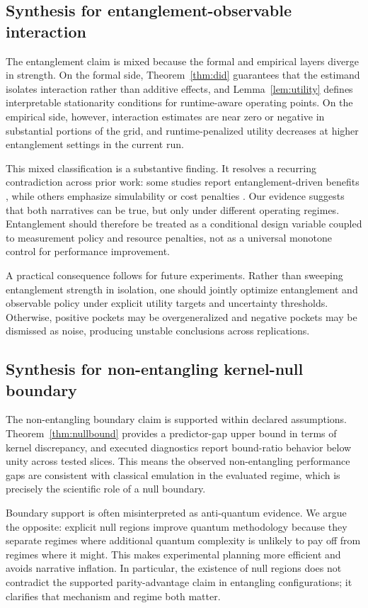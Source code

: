 \documentclass{article} %
\begin{document}
\subsection{Synthesis for entanglement-observable interaction}
The entanglement claim is mixed because the formal and empirical layers diverge in strength. On the formal side, Theorem~\ref{thm:did} guarantees that the estimand isolates interaction rather than additive effects, and Lemma~\ref{lem:utility} defines interpretable stationarity conditions for runtime-aware operating points. On the empirical side, however, interaction estimates are near zero or negative in substantial portions of the grid, and runtime-penalized utility decreases at higher entanglement settings in the current run.

This mixed classification is a substantive finding. It resolves a recurring contradiction across prior work: some studies report entanglement-driven benefits \citep{S003,S033,S039}, while others emphasize simulability or cost penalties \citep{S002,S038}. Our evidence suggests that both narratives can be true, but only under different operating regimes. Entanglement should therefore be treated as a conditional design variable coupled to measurement policy and resource penalties, not as a universal monotone control for performance improvement.

A practical consequence follows for future experiments. Rather than sweeping entanglement strength in isolation, one should jointly optimize entanglement and observable policy under explicit utility targets and uncertainty thresholds. Otherwise, positive pockets may be overgeneralized and negative pockets may be dismissed as noise, producing unstable conclusions across replications.

\subsection{Synthesis for non-entangling kernel-null boundary}
The non-entangling boundary claim is supported within declared assumptions. Theorem~\ref{thm:nullbound} provides a predictor-gap upper bound in terms of kernel discrepancy, and executed diagnostics report bound-ratio behavior below unity across tested slices. This means the observed non-entangling performance gaps are consistent with classical emulation in the evaluated regime, which is precisely the scientific role of a null boundary.

Boundary support is often misinterpreted as anti-quantum evidence. We argue the opposite: explicit null regions improve quantum methodology because they separate regimes where additional quantum complexity is unlikely to pay off from regimes where it might. This makes experimental planning more efficient and avoids narrative inflation. In particular, the existence of null regions does not contradict the supported parity-advantage claim in entangling configurations; it clarifies that mechanism and regime both matter.
\end{document}
